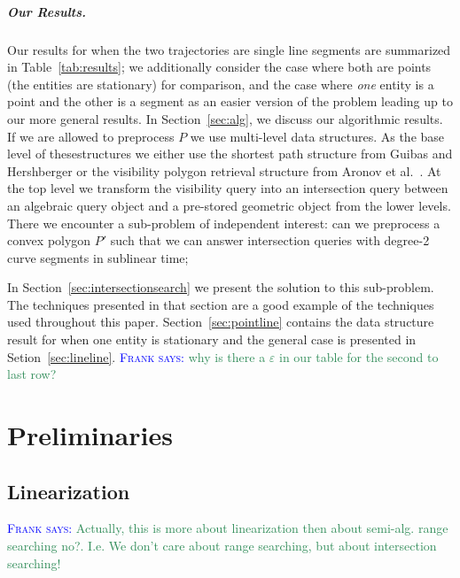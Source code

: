 \documentclass[UKenglish]{lipics-v2019}
\newcommand{\myremark}[4]{\textcolor{blue}{\textsc{#1 #2:}} \textcolor{#4}{\textsf{#3}}}
\newcommand{\frank}[2][says]{\myremark{Frank}{#1}{#2}{SeaGreen}}
\newcommand{\etal}{\textnormal{et al.}\xspace}
\begin{document}
\subparagraph {Our Results.}
  Our results for when the two trajectories are single line segments are summarized in Table~\ref {tab:results}; we additionally consider the case where both are points (the entities are stationary) for comparison, and the case where {\em one} entity is a point and the other is a segment as an easier version of the problem leading up to our more general results.
  In Section~\ref{sec:alg}, we discuss our algorithmic results.
  If we are allowed to preprocess $P$ we use multi-level data structures. As the base level of thesestructures we either use the shortest path structure from Guibas and Hershberger \cite{guibas1989optimal} or the visibility polygon retrieval structure from Aronov \etal~\cite{aronov2002visibility}. At the top level we transform the visibility query into an intersection query between an algebraic query object and a pre-stored geometric object from the lower levels. There we encounter a sub-problem of independent interest: can we preprocess a convex polygon $P'$ such that we can answer intersection queries with degree-2 curve segments in sublinear time; 
  
  In Section~\ref{sec:intersectionsearch} we present the solution to this sub-problem. The techniques presented in that section are a good example of the techniques used throughout this paper. Section~\ref{sec:pointline} contains the data structure result for when one entity is stationary and the general case is presented in Setion~\ref{sec:lineline}.
\frank{why is there a $\varepsilon$ in our table for the second to
  last row?}

  
\section{Preliminaries}
\label{sec:prelims}

\subsection{Linearization}
\label{subsec:}

\frank{Actually, this is more about linearization then about
  semi-alg. range searching no?. I.e. We don't care about range
  searching, but about intersection searching!}
\end{document}
